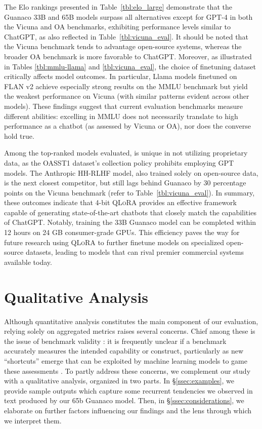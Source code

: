 The Elo rankings presented in Table~\ref{tbl:elo_large} demonstrate that the {Guanaco} 33B and 65B models surpass all alternatives except for GPT-4 in both the Vicuna and OA benchmarks, exhibiting performance levels similar to ChatGPT, as also reflected in Table~\ref{tbl:vicuna_eval}. It should be noted that the Vicuna benchmark tends to advantage open-source systems, whereas the broader OA benchmark is more favorable to ChatGPT. Moreover, as illustrated in Tables \ref{tbl:mmlu-llama} and \ref{tbl:vicuna_eval}, the choice of finetuning dataset critically affects model outcomes. In particular, Llama models finetuned on FLAN v2 achieve especially strong results on the MMLU benchmark but yield the weakest performance on Vicuna (with similar patterns evident across other models). These findings suggest that current evaluation benchmarks measure different abilities: excelling in MMLU does not necessarily translate to high performance as a chatbot (as assessed by Vicuna or OA), nor does the converse hold true.

Among the top-ranked models evaluated, is unique in not utilizing proprietary data, as the OASST1 dataset’s collection policy prohibits employing GPT models. The Anthropic HH-RLHF model, also trained solely on open-source data, is the next closest competitor, but still lags behind {Guanaco} by 30 percentage points on the Vicuna benchmark (refer to Table~\ref{tbl:vicuna_eval}). In summary, these outcomes indicate that 4-bit \textsc{QLoRA} provides an effective framework capable of generating state-of-the-art chatbots that closely match the capabilities of ChatGPT. Notably, training the 33B {Guanaco} model can be completed within 12 hours on 24 GB consumer-grade GPUs. This efficiency paves the way for future research using \textsc{QLoRA} to further finetune models on specialized open-source datasets, leading to models that can rival premier commercial systems available today.

\section{Qualitative Analysis}

Although quantitative analysis constitutes the main component of our evaluation, relying solely on aggregated metrics raises several concerns. Chief among these is the issue of benchmark validity \citep{liao2021we}: it is frequently unclear if a benchmark accurately measures the intended capability or construct, particularly as new ``shortcuts'' emerge that can be exploited by machine learning models to game these assessments \citep{gururangan2018annotation, poliak2018hypothesis}. To partly address these concerns, we complement our study with a qualitative analysis, organized in two parts. In \S\ref{ssec:examples}, we provide sample outputs which capture some recurrent tendencies we observed in text produced by our 65b {Guanaco} model. Then, in \S\ref{ssec:considerations}, we elaborate on further factors influencing our findings and the lens through which we interpret them.

